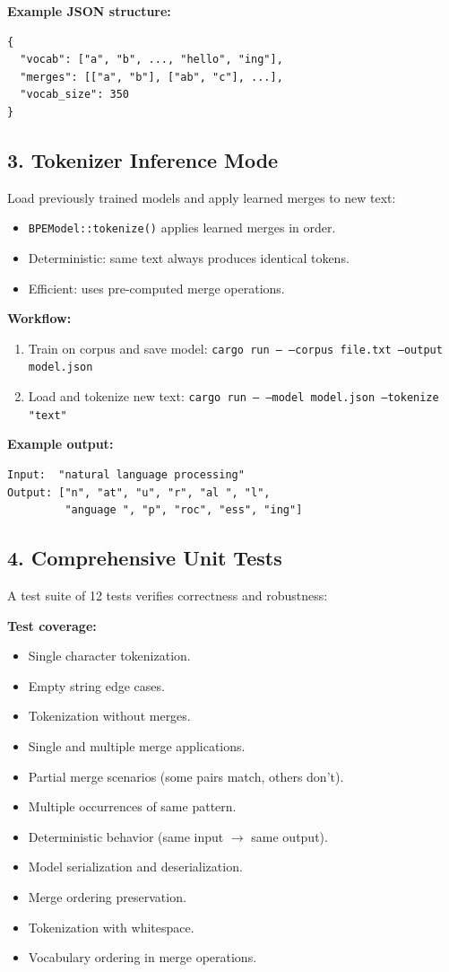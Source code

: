 \documentclass[11pt]{article}
\begin{document}
\textbf{Example JSON structure:}
\begin{verbatim}
{
  "vocab": ["a", "b", ..., "hello", "ing"],
  "merges": [["a", "b"], ["ab", "c"], ...],
  "vocab_size": 350
}
\end{verbatim}

\subsection{3. Tokenizer Inference Mode}
Load previously trained models and apply learned merges to new text:
\begin{itemize}[leftmargin=1.2em]
  \item \texttt{BPEModel::tokenize()} applies learned merges in order.
  \item Deterministic: same text always produces identical tokens.
  \item Efficient: uses pre-computed merge operations.
\end{itemize}

\textbf{Workflow:}
\begin{enumerate}[leftmargin=1.5em]
  \item Train on corpus and save model: \texttt{cargo run -- --corpus file.txt --output model.json}
  \item Load and tokenize new text: \texttt{cargo run -- --model model.json --tokenize "text"}
\end{enumerate}

\textbf{Example output:}
\begin{verbatim}
Input:  "natural language processing"
Output: ["n", "at", "u", "r", "al ", "l", 
         "anguage ", "p", "roc", "ess", "ing"]
\end{verbatim}

\subsection{4. Comprehensive Unit Tests}
A test suite of 12 tests verifies correctness and robustness:

\textbf{Test coverage:}
\begin{itemize}[leftmargin=1.2em]
  \item Single character tokenization.
  \item Empty string edge cases.
  \item Tokenization without merges.
  \item Single and multiple merge applications.
  \item Partial merge scenarios (some pairs match, others don't).
  \item Multiple occurrences of same pattern.
  \item Deterministic behavior (same input $\rightarrow$ same output).
  \item Model serialization and deserialization.
  \item Merge ordering preservation.
  \item Tokenization with whitespace.
  \item Vocabulary ordering in merge operations.
\end{itemize}
\end{document}
